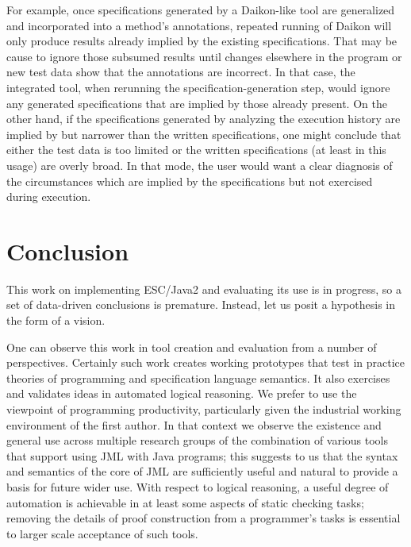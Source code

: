 \documentclass{acm_proc_article-sp}
\begin{document}
For example, once specifications generated by a Daikon-like tool are
generalized and incorporated into a method's annotations, repeated
running of Daikon will only produce results already implied by the
existing specifications.  That may be cause to ignore those subsumed
results until changes elsewhere in the program or new test data show
that the annotations are incorrect.  In that case, the integrated tool,
when rerunning the specification-generation step, would ignore any
generated specifications that are implied by those already present.
On the other hand, if the
specifications generated by analyzing the execution history are
implied by but narrower than the written specifications, one might
conclude that either the test data is too limited or the written
specifications (at least in this usage) are overly broad.  In that mode,
the user would want a clear diagnosis of the circumstances which
are implied by the specifications but not exercised during execution. 


\section{Conclusion}

This work on implementing ESC/Java2 and evaluating its use is in progress, so a
set of data-driven conclusions is premature.  Instead, let us posit a hypothesis in the form of a vision.

One can observe this work in tool creation and evaluation from a number 
of perspectives.  Certainly such work creates working prototypes that test in practice
theories of programming and specification language semantics.
It also exercises and validates ideas in automated logical reasoning.
We prefer to use the viewpoint of programming productivity,
particularly given the industrial working environment of the first author.  In that
context we observe 
the existence and general use across multiple research groups of the combination of various tools that support
using JML with Java programs; this suggests to us
 that the syntax and semantics of the core of JML are 
sufficiently useful and natural to provide a basis for future wider use.
With respect to logical reasoning, a useful degree of automation is achievable in 
at least some aspects of
static checking tasks; removing the details of proof construction from a programmer's
tasks is essential to larger scale acceptance of such tools.
\end{document}
